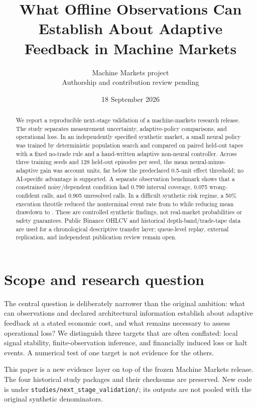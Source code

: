 \documentclass[10pt]{article}
\title{What Offline Observations Can Establish About Adaptive Feedback in Machine Markets}
\author{Machine Markets project\\\small Authorship and contribution review pending}
\date{18 September 2026}
\newcommand{\codelink}[1]{\texttt{#1}}
\begin{document}
\maketitle

\begin{abstract}
We report a reproducible next-stage validation of a machine-markets research
release. The study separates measurement uncertainty, adaptive-policy
comparisons, and operational loss. In an independently specified synthetic
market, a small neural policy was trained by deterministic population search and
compared on paired held-out tapes with a fixed no-trade rule and a hand-written
adaptive non-neural controller. Across three training seeds and 128 held-out
episodes per seed, the mean neural-minus-adaptive gain was
\MeanNeuralAdaptive{} account units, far below the predeclared 0.5-unit effect
threshold; no AI-specific advantage is supported. A separate observation
benchmark shows that a constrained noisy/dependent condition had 0.790 interval
coverage, 0.075 wrong-confident calls, and 0.905 unresolved calls. In a
difficult synthetic risk regime, a 50\% execution throttle reduced the
nonterminal event rate from \InterventionNoneRate{} to
\InterventionThrottleRate{} while reducing mean drawdown to
\InterventionThrottleDrawdown{}. These are controlled synthetic findings, not
real-market probabilities or safety guarantees. Public Binance OHLCV and
historical depth-band/trade-tape data are used for a chronological descriptive
transfer layer; queue-level replay, external replication, and independent
publication review remain open.
\end{abstract}

\section{Scope and research question}

The central question is deliberately narrower than the original ambition:
what can observations and declared architectural information establish about
adaptive feedback at a stated economic cost, and what remains necessary to
assess operational loss? We distinguish three targets that are often conflated:
local signal stability, finite-observation inference, and financially induced
loss or halt events. A numerical test of one target is not evidence for the
others.

This paper is a new evidence layer on top of the frozen Machine Markets release.
The four historical study packages and their checksums are preserved. New code
is under \codelink{studies/next\_stage\_validation/}; its outputs are not pooled
with the original synthetic denominators.
\end{document}
